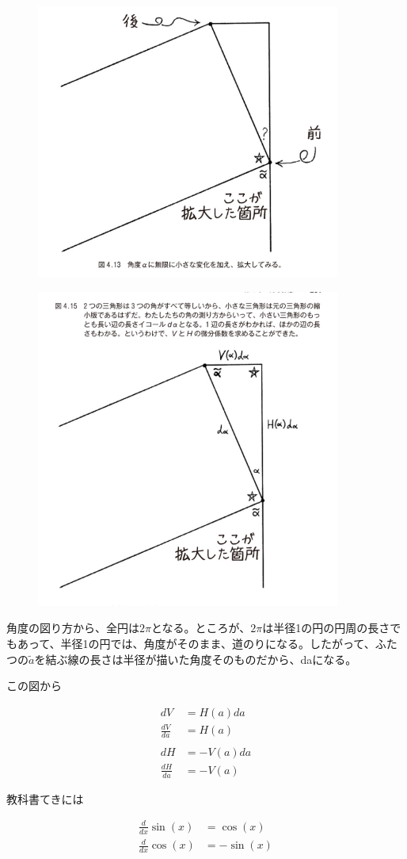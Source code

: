 \documentclass[dvipdfmx]{jsarticle}
\begin{document}
\begin{enumerate}
\begin{figure}[h]
  \centering
  \includegraphics[width=10cm]{images/burn_math_4-13.png}
\end{figure}

\begin{figure}[h]
  \centering
  \includegraphics[width=10cm]{images/burn_math_4-15.png}
\end{figure}


角度の図り方から、全円は$2\pi$となる。ところが、$2\pi$は半径1の円の円周の長さでもあって、半径1の円では、角度がそのまま、道のりになる。したがって、ふたつの$\tilde{a}$を結ぶ線の長さは半径が描いた角度そのものだから、daになる。

この図から

\begin{align*}
dV &= H(a)da \\
\frac{dV}{da} &= H(a) \\
\\
dH &= -V(a)da \\
\frac{dH}{da} &= -V(a)
\end{align*}

教科書てきには

\begin{align*}
  \frac{d}{dx}\sin (x) &= \cos (x) \\
  \frac{d}{dx}\cos (x) &= -\sin (x)
\end{align*}


\end{enumerate}
\end{document}
